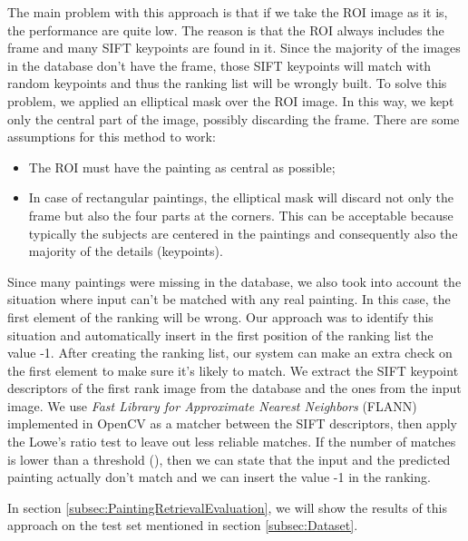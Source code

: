 \documentclass[10pt,twocolumn,letterpaper]{article}
\begin{document}
The main problem with this approach is that if we take the ROI image as it is, the performance are quite low. The reason is that the ROI always includes the frame and many SIFT keypoints are found in it. Since the majority of the images in the database don't have the frame, those SIFT keypoints will match with random keypoints and thus the ranking list will be wrongly built.
To solve this problem, we applied an elliptical mask over the ROI image. In this way, we kept only the central part of the image, possibly discarding the frame. There are some assumptions for this method to work:
\begin{itemize}
    \item The ROI must have the painting as central as possible;
    \item In case of rectangular paintings, the elliptical mask will discard not only the frame but also the four parts at the corners. This can be acceptable because typically the subjects are centered in the paintings and consequently also the majority of the details (\ie keypoints).
\end{itemize}

Since many paintings were missing in the database, we also took into account the situation where input can't be matched with any real painting. In this case, the first element of the ranking will be wrong. Our approach was to identify this situation and automatically insert in the first position of the ranking list the value -1. 
After creating the ranking list, our system can make an extra check on the first element to make sure it's likely to match. We extract the SIFT keypoint descriptors of the first rank image from the database and the ones from the input image. We use \textit{Fast Library for Approximate Nearest Neighbors} (FLANN) \cite{Muja09fastapproximate} implemented in OpenCV as a matcher between the SIFT descriptors, then apply the Lowe's ratio test to leave out less reliable matches. If the number of matches is lower than a threshold (), then we can state that the input and the predicted painting actually don't match and we can insert the value -1 in the ranking.

In section \ref{subsec:PaintingRetrievalEvaluation}, we will show the results of this approach on the test set mentioned in section \ref{subsec:Dataset}.
\end{document}
